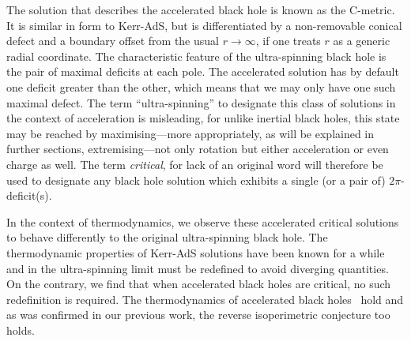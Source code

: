 \documentclass[
twoside,openright,frontopenright]{dmathesis}
\newcommand{\todoopt}[2][]{\todo[color=blue!20,size=\footnotesize,#1]{#2}}
\begin{document}
The solution that describes the accelerated black hole is known as the
C-metric\todoopt{citations}. It is similar in form to Kerr-AdS,
but is differentiated by a non-removable conical defect and a boundary offset
from the usual $r\to\infty$, if one treats $r$ as a generic radial
coordinate. The characteristic feature of the ultra-spinning black hole is the
pair of maximal deficits at each pole. The accelerated solution has by default
one deficit greater than the other, which means that we may only have one such
maximal defect. The term ``ultra-spinning'' to designate this class of solutions
in the context of acceleration is misleading, for unlike inertial black holes,
this state may be reached by maximising---more appropriately, as will be
explained in further sections, extremising---not only rotation but either
acceleration or even charge as well. The term \emph{critical}, for lack of an
original word will therefore be used to designate any black hole solution which
exhibits a single (or a pair of) $2\pi$-deficit(s).

In the context of thermodynamics, we observe these accelerated critical
solutions to behave differently to the original ultra-spinning black hole. The
thermodynamic properties of Kerr-AdS solutions have been known for a
while~\cite{Gibbons:2004ai, Silva:2002jq, Caldarelli:1999xj, Hawking:1998kw,
  Kostelecky:1995ei, Hawking:1982dh} and in the ultra-spinning limit must be
redefined to avoid diverging quantities. On the contrary, we find that when
accelerated black holes are critical, no such redefinition is required. The
thermodynamics of accelerated black holes~\cite{Appels:2017xoe,Appels:2016uha}
hold and as was confirmed in our previous work, the reverse isoperimetric
conjecture too holds.
\todoopt[inline]{structure/outline}

\end{document}
